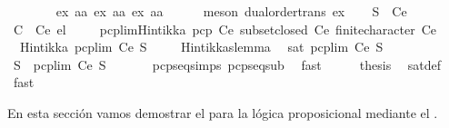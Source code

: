 \begin{isabellebody}
\ \ \ \ \ \ \isamarkupfalse%
\ ex{}{\isacharbrackleft}\ {\isacharprime}a{\isacharequal}{\isacharprime}a{\isacharbrackright}\ ex{}{\isacharbrackleft}\ {\isacharprime}a{\isacharequal}{\isacharprime}a{\isacharbrackright}\ ex{}{\isacharbrackleft}\ {\isacharprime}a{\isacharequal}{\isacharprime}a{\isacharbrackright}\isanewline
\ \ \ \ \isamarkupfalse%
\ {\isacharparenleft}meson\ dual{\isacharunderscore}order{\isachardot}trans\ ex{}{\isacharparenright}\isanewline
\ \ \isamarkupfalse%
\ {\isachardoublequoteopen}S\ {\isasymin}\ Ce{\isachardoublequoteclose}\ \isamarkupfalse%
\ {\isacartoucheopen}C\ {\isasymsubseteq}\ Ce{\isacartoucheclose}\ el\ \isacommand{{\isachardot}{\isachardot}}\isamarkupfalse%
\isanewline
\ \ \isamarkupfalse%
\ pcp{\isacharunderscore}lim{\isacharunderscore}Hintikka\ {\isacartoucheopen}pcp\ Ce{\isacartoucheclose}\ {\isacartoucheopen}subset{\isacharunderscore}closed\ Ce{\isacartoucheclose}\ {\isacartoucheopen}finite{\isacharunderscore}character\ Ce{\isacartoucheclose}\isanewline
\ \ \isamarkupfalse%
\ \ {\isachardoublequoteopen}Hintikka\ {\isacharparenleft}pcp{\isacharunderscore}lim\ Ce\ S{\isacharparenright}{\isachardoublequoteclose}\ \isacommand{{\isachardot}}\isamarkupfalse%
\isanewline
\ \ \isamarkupfalse%
\ Hintikkaslemma\ \isamarkupfalse%
\ {\isachardoublequoteopen}sat\ {\isacharparenleft}pcp{\isacharunderscore}lim\ Ce\ S{\isacharparenright}{\isachardoublequoteclose}\ \isacommand{{\isachardot}}\isamarkupfalse%
\isanewline
\ \ \isamarkupfalse%
\ \isamarkupfalse%
\ {\isachardoublequoteopen}S\ {\isasymsubseteq}\ pcp{\isacharunderscore}lim\ Ce\ S{\isachardoublequoteclose}\ \isanewline
\ \ \ \ \isamarkupfalse%
\ pcp{\isacharunderscore}seq{\isachardot}simps{\isacharparenleft}{}{\isacharparenright}\ pcp{\isacharunderscore}seq{\isacharunderscore}sub\ \isamarkupfalse%
\ fast\isanewline
\ \ \isamarkupfalse%
\ \isamarkupfalse%
\ {\isacharquery}thesis\ \isamarkupfalse%
\ sat{\isacharunderscore}def\ \isamarkupfalse%
\ fast\isanewline
{}\isamarkupfalse%
%
\endisatagproof
{\isafoldproof}%
%
\isadelimproof
%
\endisadelimproof
%
\isadelimdocument
%
\endisadelimdocument
%
\isatagdocument
%
\isamarkuptrue%
%
\endisatagdocument
{\isafolddocument}%
%
\isadelimdocument
%
\endisadelimdocument
%
\begin{isamarkuptext}%
En esta sección vamos demostrar el  para la lógica proposicional
  mediante el .


\end{isamarkuptext}
\end{isabellebody}
